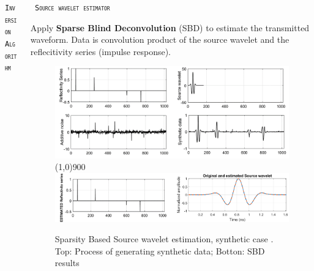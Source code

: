 \documentclass[final]{beamer}
\newlength{\onecolwid}
\newlength{\twocolwid}
\begin{document}
\begin{frame}[t]
\begin{columns}[t]
\begin{column}{\twocolwid}
\begin{columns}[t,totalwidth=\twocolwid]
\begin{column}{\onecolwid}
\begin{block}{\textsc{\texttt{Inversion Algorithm}}}
\end{block}


\end{column} %

\begin{column}{\onecolwid}\vspace{-.6in} %


\begin{block}{\textsc{\texttt{ Source wavelet estimator}}}
	
Apply \textbf{Sparse Blind Deconvolution} (SBD) to estimate the transmitted waveform. Data is convolution product of the source wavelet and the reflecitivity series (impulse response).

	\begin{figure}
		\includegraphics[width=1\linewidth]{synthtic_model_SBD.png}
		\vspace{-3mm}
		\line(1,0){900}
		\vspace{1cm}
		\includegraphics[width=0.98\linewidth]{SBD_synthetic_refl.png}
		\caption{Sparsity Based Source wavelet estimation, synthetic case \cite{jazayeri2017sparse}.
		Top: Process of generating synthetic data; Botton: SBD results}
	\end{figure}
	

\end{block}
\end{column}
\end{columns}
\end{column}
\end{columns}
\end{frame}
\end{document}
